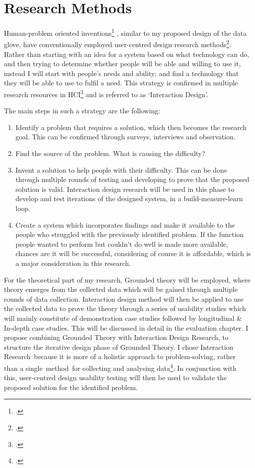\chapter{Research Methods}

Human-problem oriented inventions\footcite{Cox2008} , similar to my proposed design of the data glove, have conventionally employed user-centred design research methods\footcite{Bevan1999}. Rather than starting with an idea for a system based on what technology can do, and then trying to determine whether people will be able and willing to use it, instead I will start with people's needs and ability; and find a technology that they will be able to use to fulfil a need. This strategy is confirmed in multiple research resources in HCI\footcite{Dix2004} and is referred to as ‘Interaction Design’.

The main steps in such a strategy are the following: 

\begin{enumerate}
    \item Identify a problem that requires a solution, which then becomes the research goal. This can be confirmed through surveys, interviews and observation. 
    \item Find the source of the problem. What is causing the difficulty?
    \item Invent a solution to help people with their difficulty. This can be done through multiple rounds of testing and developing to prove that the proposed solution is valid. Interaction design research will be used in this phase to develop and test iterations of the designed system, in a build-measure-learn loop.
    \item Create a system which incorporates findings and make it available to the people who struggled with the previously identified problem. If the function people wanted to perform but couldn't do well is made more available, chances are it will be successful, considering of course it is affordable, which is a major consideration in this research.
\end{enumerate}

For the theoretical part of my research, Grounded theory will be employed, where theory emerges from the collected data which will be gained through multiple rounds of data collection. Interaction design method will then be applied to use the collected data to prove the theory through a series of usability studies which will mainly constitute of demonstration case studies followed by longitudinal \& In-depth case studies. This will be discussed in detail in the evaluation chapter.
I propose combining Grounded Theory with Interaction Design Research, to structure the iterative design phase of Grounded Theory. I chose Interaction Research because it is more of a holistic approach to problem-solving, rather than a single method for collecting and analysing data\footcite{OBrienRoryFacultyofInformationStudies2001}. In conjunction with this, user-centred design usability testing will then be used to validate the proposed solution for the identified problem. 

